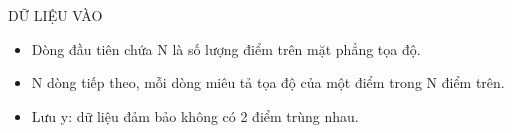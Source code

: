 DỮ LIỆU VÀO
\begin{itemize}
	\item Dòng đầu tiên chứa N là số lượng điểm trên mặt phẳng tọa độ.
	\item N dòng tiếp theo, mỗi dòng miêu tả tọa độ của một điểm trong N điểm trên.
	\item Lưu y: dữ liệu đảm bảo không có 2 điểm trùng nhau.
\end{itemize}